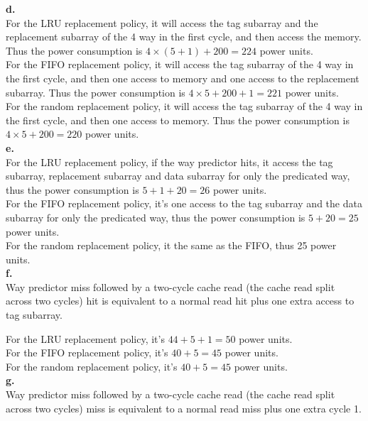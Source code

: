 \documentclass{article}
\begin{document}
\textbf{d.}\\
\indent For the LRU replacement policy, it will access the tag subarray and the replacement subarray of the 4 way in the first cycle, and then access the memory. Thus the power consumption is $4\times(5+1)+200=224$ power units.\\

For the FIFO replacement policy, it will access the tag subarray of the 4 way in the first cycle, and then one access to memory and one access to the replacement subarray. Thus the power consumption is $4\times5+200+1=221$ power units.\\

For the random replacement policy, it will access the tag subarray of the 4 way in the first cycle, and then one access to memory. Thus the power consumption is $4\times5+200=220$ power units.\\

\textbf{e.}\\
\indent For the LRU replacement policy, if the way predictor hits, it access the tag subarray, replacement subarray and data subarray for only the predicated way, thus the power consumption is $5+1+20=26$ power units.\\

For the FIFO replacement policy, it's one access to the tag subarray and the data subarray for only the predicated way, thus the power consumption is $5+20=25$ power units.\\

For the random replacement policy, it the same as the FIFO, thus 25 power units.\\

\textbf{f.}\\
Way predictor miss followed by a two-cycle cache read (the cache read split across two cycles) hit is equivalent to a normal read hit plus one extra access to tag subarray.

\indent For the LRU replacement policy, it's $44+5+1=50$ power units.\\

\indent For the FIFO replacement policy, it's $40+5=45$ power units.\\

\indent For the random replacement policy, it's $40+5=45$ power units.\\

\textbf{g.}\\
\indent Way predictor miss followed by a two-cycle cache read (the cache read split across two cycles) miss is equivalent to a normal read miss plus one extra cycle 1.
\end{document}
